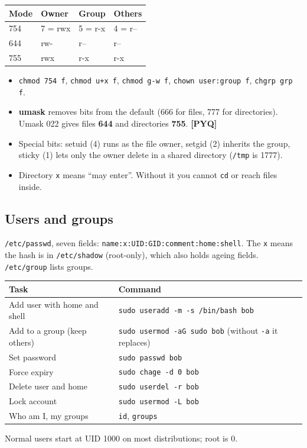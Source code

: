\documentclass[11pt,a4paper]{article}
\newcommand{\pyq}{\textcolor{ember}{\scriptsize\textbf{[PYQ]}}}
\begin{document}
\begin{center}\small\renewcommand{\arraystretch}{1.18}\setlength{\tabcolsep}{9pt}
\begin{tabular}{@{}llll@{}}
\toprule
\textbf{\color{slate}Mode} & \textbf{\color{slate}Owner} & \textbf{\color{slate}Group} & \textbf{\color{slate}Others} \\ \midrule
754 & 7 = rwx & 5 = r-x & 4 = r-- \\
644 & rw- & r-- & r-- \\
755 & rwx & r-x & r-x \\
\bottomrule
\end{tabular}\end{center}
\begin{itemize}
\item \texttt{chmod 754 f}, \texttt{chmod u+x f}, \texttt{chmod g-w f}, \texttt{chown user:group f}, \texttt{chgrp grp f}.
\item \textbf{umask} removes bits from the default (666 for files, 777 for directories). Umask 022 gives files \textbf{644} and directories \textbf{755}. \pyq{}
\item Special bits: setuid (4) runs as the file owner, setgid (2) inherits the group, sticky (1) lets only the owner delete in a shared directory (\texttt{/tmp} is 1777).
\item Directory \texttt{x} means ``may enter''. Without it you cannot \texttt{cd} or reach files inside.
\end{itemize}
\subsection{Users and groups}
\texttt{/etc/passwd}, seven fields: \texttt{name:x:UID:GID:comment:home:shell}. The \texttt{x} means the hash is in \texttt{/etc/shadow} (root-only), which also holds ageing fields. \texttt{/etc/group} lists groups.

\begin{center}\small\renewcommand{\arraystretch}{1.18}\setlength{\tabcolsep}{9pt}
\begin{tabularx}{\linewidth}{@{}>{\raggedright\arraybackslash}X>{\raggedright\arraybackslash}X@{}}
\toprule
\textbf{\color{slate}Task} & \textbf{\color{slate}Command} \\ \midrule
Add user with home and shell & \texttt{sudo useradd -m -s /bin/bash bob} \\
Add to a group (keep others) & \texttt{sudo usermod -aG sudo bob} (without \texttt{-a} it replaces) \\
Set password & \texttt{sudo passwd bob} \\
Force expiry & \texttt{sudo chage -d 0 bob} \\
Delete user and home & \texttt{sudo userdel -r bob} \\
Lock account & \texttt{sudo usermod -L bob} \\
Who am I, my groups & \texttt{id}, \texttt{groups} \\
\bottomrule
\end{tabularx}\end{center}
Normal users start at UID 1000 on most distributions; root is 0.
\end{document}
